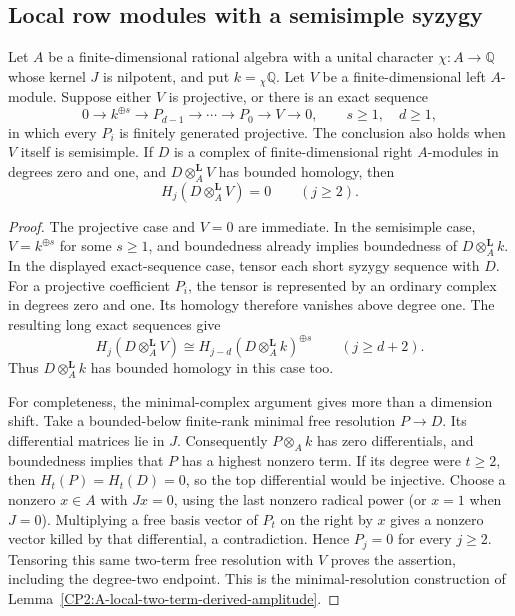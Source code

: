 \subsection{Local row modules with a semisimple syzygy}

\begin{lemma}
\label{CP2:A-local-semisimple-syzygy-two-term}
Let $A$ be a finite-dimensional rational algebra with a unital character
$\chi:A\to\mathbb Q$ whose kernel $J$ is nilpotent, and put
$k={}_\chi\mathbb Q$.
Let $V$ be a finite-dimensional left $A$-module.  Suppose either $V$ is
projective, or there is an exact sequence
\[
 0\longrightarrow k^{\oplus s}\longrightarrow P_{d-1}
 \longrightarrow\cdots\longrightarrow P_0\longrightarrow V
 \longrightarrow0,
 \qquad s\ge1,\quad d\ge1,
\]
in which every $P_i$ is finitely generated projective.  The conclusion
also holds when $V$ itself is semisimple.
If $D$ is a complex of finite-dimensional right $A$-modules in degrees
zero and one, and $D\otimes_A^{\mathbf L}V$ has bounded homology, then
\[
 H_j(D\otimes_A^{\mathbf L}V)=0\qquad(j\ge2).
\]
\end{lemma}
\begin{proof}
The projective case and $V=0$ are immediate.  In the semisimple case,
$V=k^{\oplus s}$ for some $s\ge1$, and boundedness already implies
boundedness of $D\otimes_A^{\mathbf L}k$.
In the displayed exact-sequence case, tensor each short syzygy sequence
with $D$.  For a projective coefficient $P_i$, the tensor is represented
by an ordinary complex in degrees zero and one.  Its homology therefore
vanishes above degree one.  The resulting long exact sequences give
\[
 H_j(D\otimes_A^{\mathbf L}V)
 \cong H_{j-d}(D\otimes_A^{\mathbf L}k)^{\oplus s}
 \qquad(j\ge d+2).
\]
Thus $D\otimes_A^{\mathbf L}k$ has bounded homology in this case too.

For completeness, the minimal-complex argument gives more than a
dimension shift.  Take a bounded-below finite-rank minimal free
resolution $P\to D$.  Its differential matrices lie in $J$.
Consequently $P\otimes_A k$ has zero differentials, and boundedness
implies that $P$ has a highest nonzero term.  If its degree were
$t\ge2$, then $H_t(P)=H_t(D)=0$, so the top differential would be
injective.  Choose a nonzero $x\in A$ with $Jx=0$, using the last
nonzero radical power (or $x=1$ when $J=0$).  Multiplying a free basis
vector of $P_t$ on the right by $x$ gives a nonzero vector killed by
that differential, a contradiction.  Hence $P_j=0$ for every $j\ge2$.
Tensoring this same two-term free resolution with $V$ proves the
assertion, including the degree-two endpoint.
This is the minimal-resolution construction of
Lemma~\ref{CP2:A-local-two-term-derived-amplitude}.
\end{proof}

